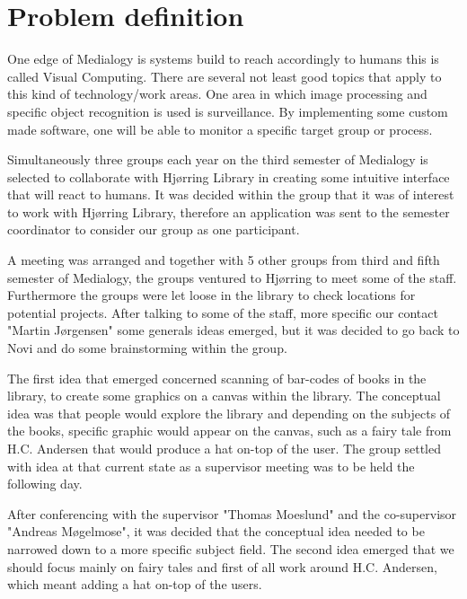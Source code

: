 \chapter{Problem definition}
One edge of Medialogy is systems build to reach accordingly to humans this is called Visual Computing. There are several not least good topics that apply to this kind of technology/work areas. One area in which image processing and specific object recognition is used is surveillance. By implementing some custom made software, one will be able to monitor a specific target group or process. 

Simultaneously three groups each year on the third semester of Medialogy is selected to collaborate with Hjørring Library in creating some intuitive interface that will react to humans. It was decided within the group that it was of interest to work with Hjørring Library, therefore an application was sent to the semester coordinator to consider our group as one participant.

A meeting was arranged and together with 5 other groups from third and fifth semester of Medialogy, the groups ventured to Hjørring to meet some of the staff. Furthermore the groups were let loose in the library to check locations for potential projects. After talking to some of the staff, more specific our contact "Martin Jørgensen" some generals ideas emerged, but it was decided to go back to Novi and do some brainstorming within the group.

The first idea that emerged concerned scanning of bar-codes of books in the library, to create some graphics on a canvas within the library. The conceptual idea was that people would explore the library and depending on the subjects of the books, specific graphic would appear on the canvas, such as a fairy tale from H.C. Andersen that would produce a hat on-top of the user. The group settled with idea at that current state as a supervisor meeting was to be held the following day.

After conferencing with the supervisor "Thomas Moeslund" and the co-supervisor "Andreas Møgelmose", it was decided that the conceptual idea needed to be narrowed down to a more specific subject field. The second idea emerged that we should focus mainly on fairy tales and first of all work around H.C. Andersen, which meant adding a hat on-top of the users.

